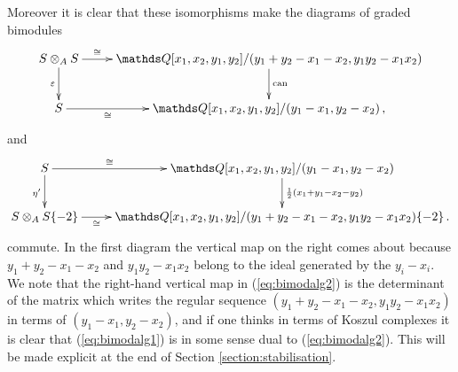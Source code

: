 \documentclass{compositio}
\theoremstyle{definition}
\numberwithin{equation}{section}
\def\can{\operatorname{can}}
\begin{document}
Moreover it is clear that these isomorphisms make the diagrams of graded bimodules
\begin{equation}
\label{eq:bimodalg1}
\xymatrix{
S \otimes_A S \ar[d]_{\varepsilon} \ar[r]^-{\cong} & \QQ[x_1,x_2,y_1,y_2]/(y_1 + y_2 - x_1 - x_2, y_1 y_2 - x_1 x_2) \ar[d]^{\can}\\
S \ar[r]_-{\cong} & \QQ[x_1,x_2,y_1,y_2]/(y_1 - x_1, y_2 - x_2)\,,
}
\end{equation}
and
\begin{equation}
\label{eq:bimodalg2}
\xymatrix{
S \ar[r]^-{\cong}\ar[d]_{\eta'} & \QQ[x_1,x_2,y_1,y_2]/(y_1 - x_1, y_2 - x_2) \ar[d]^{\frac{1}{2}(x_1 + y_1 - x_2 - y_2)}\\
S \otimes_A S\{-2\} \ar[r]_-{\cong} & \QQ[x_1,x_2,y_1,y_2]/(y_1 + y_2 - x_1 - x_2, y_1 y_2 - x_1 x_2)\{-2\}\,.
}
\end{equation}
commute. In the first diagram the vertical map on the right comes about because $y_1 + y_2 - x_1 - x_2$ and $y_1 y_2 - x_1 x_2$ belong to the ideal generated by the $y_i - x_i$. We note that the right-hand vertical map in (\ref{eq:bimodalg2}) is the determinant of the matrix which writes the regular sequence $(y_1 + y_2 - x_1 - x_2, y_1 y_2 - x_1 x_2)$ in terms of $(y_1 - x_1, y_2 - x_2)$, and if one thinks in terms of Koszul complexes it is clear that (\ref{eq:bimodalg1}) is in some sense dual to (\ref{eq:bimodalg2}). This will be made explicit at the end of Section \ref{section:stabilisation}.
\end{document}
